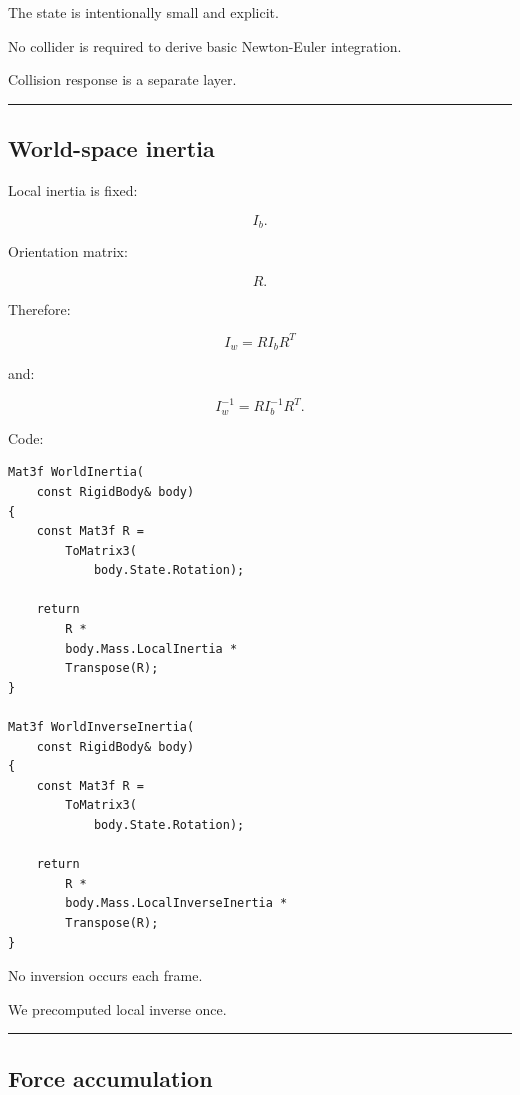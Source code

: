 The state is intentionally small and explicit.

No collider is required to derive basic Newton-Euler integration.

Collision response is a separate layer.

\begin{center}\rule{0.5\linewidth}{0.5pt}\end{center}

\subsection{World-space inertia}\label{06-engine-ii-ch039-world-space-inertia}

\hypertarget{06-engine-ii-ch039-world-space-inertia}{}

Local inertia is fixed:

\[
I_b.
\]

Orientation matrix:

\[
R.
\]

Therefore:

\[
\boxed{
I_w
=
RI_bR^T
}
\]

and:

\[
\boxed{
I_w^{-1}
=
RI_b^{-1}R^T.
}
\]

Code:

\begin{verbatim}
Mat3f WorldInertia(
    const RigidBody& body)
{
    const Mat3f R =
        ToMatrix3(
            body.State.Rotation);

    return
        R *
        body.Mass.LocalInertia *
        Transpose(R);
}

Mat3f WorldInverseInertia(
    const RigidBody& body)
{
    const Mat3f R =
        ToMatrix3(
            body.State.Rotation);

    return
        R *
        body.Mass.LocalInverseInertia *
        Transpose(R);
}
\end{verbatim}

No inversion occurs each frame.

We precomputed local inverse once.

\begin{center}\rule{0.5\linewidth}{0.5pt}\end{center}

\subsection{Force accumulation}\label{06-engine-ii-ch039-force-accumulation}

